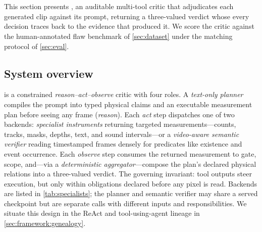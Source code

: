 \section{\PhyReAct{}}\label{sec:critic}\label{sec:compiler}

This section presents \PhyReAct{}, an auditable multi-tool critic that adjudicates
each generated clip against its prompt, returning a three-valued verdict whose every
decision traces back to the evidence that produced it. We score the critic against
the human-annotated flaw benchmark of \cref{sec:dataset} under the matching protocol
of \cref{sec:eval}.

\subsection{System overview}
\label{sec:critic-react}

\PhyReAct{} is a constrained \emph{reason--act--observe} critic with four roles. A \emph{text-only planner} compiles the prompt into typed physical claims and an executable measurement plan before seeing any frame (\emph{reason}). Each \emph{act} step dispatches one of two backends: \emph{specialist instruments} returning targeted measurements---counts, tracks, masks, depths, text, and sound intervals---or a \emph{video-aware semantic verifier} reading timestamped frames densely for predicates like existence and event occurrence. Each \emph{observe} step consumes the returned measurement to gate, scope, and---via a \emph{deterministic aggregator}---compose the plan's declared physical relations into a three-valued verdict. The governing invariant: tool outputs steer execution, but only within obligations declared before any pixel is read. Backends are listed in \cref{tab:specialists}; the planner and semantic verifier may share a served checkpoint but are separate calls with different inputs and responsibilities. We situate this design in the ReAct and tool-using-agent lineage in \cref{sec:framework:genealogy}.

